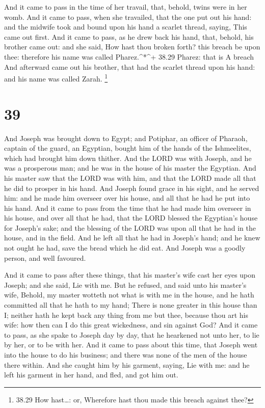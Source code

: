  And it came to pass in the time of her travail, that,
behold, twins were in her womb.  And it came to pass, when
she travailed, that the one put out his hand: and the midwife took and
bound upon his hand a scarlet thread, saying, This came out first.
 And it came to pass, as he drew back his hand, that,
behold, his brother came out: and she said, How hast thou broken forth?
this breach be upon thee: therefore his name was called
Pharez.\^{}*\^{}+ 38.29 Pharez: that is A breach  And
afterward came out his brother, that had the scarlet thread upon his
hand: and his name was called Zarah. \footnote{38.29 How hast\ldots: or,
  Wherefore hast thou made this breach against thee?}

\hypertarget{section-38}{%
\section{39}\label{section-38}}

 And Joseph was brought down to Egypt; and Potiphar, an
officer of Pharaoh, captain of the guard, an Egyptian, bought him of the
hands of the Ishmeelites, which had brought him down thither.
 And the LORD was with Joseph, and he was a prosperous man;
and he was in the house of his master the Egyptian.  And his
master saw that the LORD was with him, and that the LORD made all that
he did to prosper in his hand.  And Joseph found grace in
his sight, and he served him: and he made him overseer over his house,
and all that he had he put into his hand.  And it came to
pass from the time that he had made him overseer in his house, and over
all that he had, that the LORD blessed the Egyptian's house for Joseph's
sake; and the blessing of the LORD was upon all that he had in the
house, and in the field.  And he left all that he had in
Joseph's hand; and he knew not ought he had, save the bread which he did
eat. And Joseph was a goodly person, and well favoured.

 And it came to pass after these things, that his master's
wife cast her eyes upon Joseph; and she said, Lie with me. 
But he refused, and said unto his master's wife, Behold, my master
wotteth not what is with me in the house, and he hath committed all that
he hath to my hand;  There is none greater in this house
than I; neither hath he kept back any thing from me but thee, because
thou art his wife: how then can I do this great wickedness, and sin
against God?  And it came to pass, as she spake to Joseph
day by day, that he hearkened not unto her, to lie by her, or to be with
her.  And it came to pass about this time, that Joseph went
into the house to do his business; and there was none of the men of the
house there within.  And she caught him by his garment,
saying, Lie with me: and he left his garment in her hand, and fled, and
got him out.


